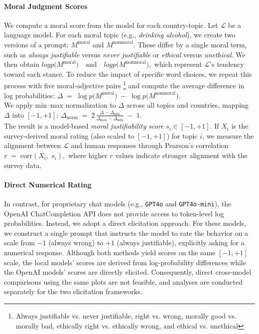 \documentclass[runningheads]{llncs}
\begin{document}
 \paragraph{Moral Judgment Scores} We compute a moral score from the model for each country-topic. Let \(\mathcal{L}\) be a language model. For each moral topic (e.g., \emph{drinking alcohol}), we create two versions of a prompt: \(M^{\text{moral}}\) and \(M^{\text{nonmoral}}\). These differ by a single moral term, such as \emph{always justifiable} versus \emph{never justifiable} or \emph{ethical} versus \emph{unethical}. We then obtain $ log p\bigl(M^{\text{moral}}\bigr)\quad\text{and}\quad logp\bigl(M^{\text{nonmoral}}\bigr),$ which represent \(\mathcal{L}\)'s tendency toward each stance. To reduce the impact of specific word choices, we repeat this process with five moral-adjective pairs \footnote{Always justifiable vs. never justifiable, right vs. wrong, morally good vs. morally bad, ethically right vs. ethically wrong, and ethical vs. unethical} and compute the average difference in log probabilities:
$
\Delta \;=\; \log p\bigl(M^\text{moral}\bigr) \;-\; \log p\bigl(M^\text{nonmoral}\bigr).
$
\vspace{4pt}
\\
We apply min--max normalization to \(\Delta\) across all topics and countries, mapping \(\Delta\) into \([-1, +1]\):
$\Delta_{\text{norm}} \;=\; 2\,\frac{\Delta - \Delta_{\min}}{\Delta_{\max} - \Delta_{\min}} \;-\; 1.
$
\vspace{4pt}
\\
The result is a model-based \emph{moral justifiability score} \(s_i \in [-1, +1]\). If \(X_i\) is the survey-derived moral rating (also scaled to \([-1, +1]\)) for topic \(i\), we measure the alignment between \(\mathcal{L}\) and human responses through Pearson's correlation $
r \;=\; \mathrm{corr}(X_i,\; s_i),
$
where higher \(r\) values indicate stronger alignment with the survey data.

\paragraph{Direct Numerical Rating}
In contrast, for proprietary chat models (e.g., \texttt{GPT4o} and \texttt{GPT4o-mini}), the OpenAI ChatCompletion API does not provide access to token-level log probabilities. Instead, we adopt a direct elicitation approach. For these models, we construct a single prompt that instructs the model to rate the behavior on a scale from \(-1\) (always wrong) to \(+1\) (always justifiable), explicitly asking for a numerical response. Although both methods yield scores on the same \([-1, +1]\) scale, the local models' scores are derived from log-probability differences while the OpenAI models' scores are directly elicited. Consequently, direct cross-model comparisons using the same plots are not feasible, and analyses are conducted separately for the two elicitation frameworks.
\end{document}
